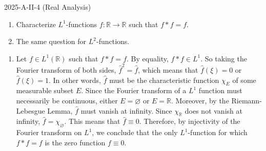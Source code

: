 \documentclass{article}
\begin{document}
\begin{prb}{2025-A-II-4 (Real Analysis)}
	$ $\newline \vspace{-0.65cm}
	\begin{enumerate}[itemsep =-2pt,label = (\roman{*})]
		\item Characterize $L^{1}$-functions $f: \mathbb{R} \to \mathbb{R}$ such that $f \ast f = f$. 
		\item The same question for $L^{2}$-functions. 
	\end{enumerate}
\end{prb}
\begin{solutions}
	\vspace{-0.35cm}
	\begin{enumerate}[itemsep =-2pt,label = (\roman{*})]
		\item Let $f \in L^{1}(\mathbb{R})$ such that $f \ast f = f$. By equality, $f \ast f \in L^{1}$. So taking the Fourier transform of both sides, $\hat{f}^{2} = \hat{f}$, which means that $\hat{f}(\xi) = 0$ or $\hat{f}(\xi) = 1$. In other words, $\hat{f}$ must be the characteristic function $\chi_{E}$ of some measurable subset $E$. Since the Fourier transform of a $L^{1}$ function must necessarily be continuous, either $E = \varnothing$ or $E = \mathbb{R}$. Moreover, by the Riemann-Lebesgue Lemma, $\hat{f}$ must vanish at infinity. Since $\chi_{\mathbb{R}}$ does not vanish at infinity, $\hat{f} = \chi_{\varnothing}$. This means that $\hat{f} \equiv 0$. Therefore, by injectivity of the Fourier transform on $L^{1}$, we conclude that the only $L^{1}$-function for which $f \ast f = f$ is the zero function $f \equiv 0$. 
	\end{enumerate}
\end{solutions}
\end{document}
